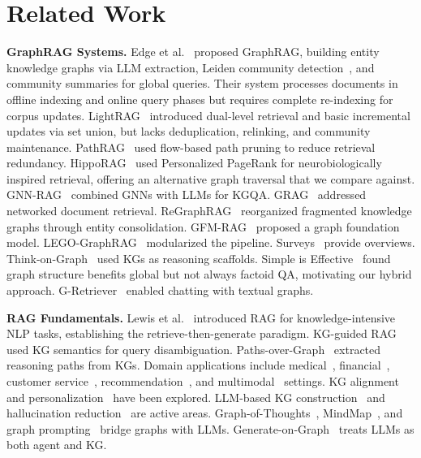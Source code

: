 \documentclass[sigconf,anonymous,review]{acmart}
\begin{document}
\section{Related Work}

\textbf{GraphRAG Systems.} Edge et al.~\cite{edge2024graphrag} proposed GraphRAG, building entity knowledge graphs via LLM extraction, Leiden community detection~\cite{traag2019leiden}, and community summaries for global queries. Their system processes documents in offline indexing and online query phases but requires complete re-indexing for corpus updates. LightRAG~\cite{guo2025lightrag} introduced dual-level retrieval and basic incremental updates via set union, but lacks deduplication, relinking, and community maintenance. PathRAG~\cite{chen2026pathrag} used flow-based path pruning to reduce retrieval redundancy. HippoRAG~\cite{gutierrez2024hipporag} used Personalized PageRank for neurobiologically inspired retrieval, offering an alternative graph traversal that we compare against. GNN-RAG~\cite{mavromatis2025gnnrag} combined GNNs with LLMs for KGQA. GRAG~\cite{hu2025grag} addressed networked document retrieval. ReGraphRAG~\cite{kim2025regraphrag} reorganized fragmented knowledge graphs through entity consolidation. GFM-RAG~\cite{luo2025gfmrag} proposed a graph foundation model. LEGO-GraphRAG~\cite{cao2024lego} modularized the pipeline. Surveys~\cite{peng2025graphsurvey,han2024graphsurvey} provide overviews. Think-on-Graph~\cite{sun2024tog,ma2025tog2} used KGs as reasoning scaffolds. Simple is Effective~\cite{li2025simple} found graph structure benefits global but not always factoid QA, motivating our hybrid approach. G-Retriever~\cite{he2024gretriever} enabled chatting with textual graphs.

\textbf{RAG Fundamentals.} Lewis et al.~\cite{lewis2020rag} introduced RAG for knowledge-intensive NLP tasks, establishing the retrieve-then-generate paradigm. KG-guided RAG~\cite{zhu2025kguided} used KG semantics for query disambiguation. Paths-over-Graph~\cite{tan2025paths} extracted reasoning paths from KGs. Domain applications include medical~\cite{wu2024junde,zhao2025medrag,liu2025detecting}, financial~\cite{sarmah2024hybridrag}, customer service~\cite{xu2024kgrag}, recommendation~\cite{wang2025kgragrec}, and multimodal~\cite{bu2025querydriven,lee2024multimodal,liang2024multimodal} settings. KG alignment~\cite{tian2025systematic} and personalization~\cite{prahlad2025personalizing} have been explored. LLM-based KG construction~\cite{zhang2024extract,hofer2024construction} and hallucination reduction~\cite{agrawal2024hallucination} are active areas. Graph-of-Thoughts~\cite{besta2024got}, MindMap~\cite{wen2024mindmap}, and graph prompting~\cite{tian2024gnn} bridge graphs with LLMs. Generate-on-Graph~\cite{yao2024gog} treats LLMs as both agent and KG.
\end{document}

